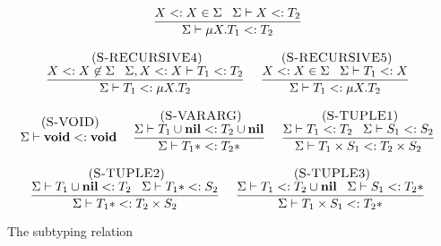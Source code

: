 \begin{figure}[!ht]
\begin{footnotesize}
$$\begin{array}{c}
\begin{array}{c}
\dfrac{X <: X \in \Sigma \;\;\;
       \Sigma \vdash X <: T_{2}}
      {\Sigma \vdash \mu X.T_{1} <: T_{2}}
\end{array}
\\ \\
\begin{array}{c}
\; (\textsc{S-RECURSIVE4})\\
\dfrac{X <: X \not\in \Sigma \;\;\;
       \Sigma, X <: X \vdash T_{1} <: T_{2}}
      {\Sigma \vdash T_{1} <: \mu X.T_{2}}
\end{array}
\;
\begin{array}{c}
\; (\textsc{S-RECURSIVE5})\\
\dfrac{X <: X \in \Sigma \;\;\;
       \Sigma \vdash T_{1} <: X}
      {\Sigma \vdash T_{1} <: \mu X.T_{2}}
\end{array}
\\ \\
\begin{array}{c}
\; (\textsc{S-VOID})\\
\Sigma \vdash \mathbf{void} <: \mathbf{void}
\end{array}
\;
\begin{array}{c}
\; (\textsc{S-VARARG})\\
\dfrac{\Sigma \vdash T_{1} \cup \mathbf{nil} <: T_{2} \cup \mathbf{nil}}
      {\Sigma \vdash T_{1}* <: T_{2}*}
\end{array}
\;
\begin{array}{c}
\; (\textsc{S-TUPLE1})\\
\dfrac{\Sigma \vdash T_{1} <: T_{2} \;\;\;
       \Sigma \vdash S_{1} <: S_{2}}
      {\Sigma \vdash T_{1} \times S_{1} <: T_{2} \times S_{2}}
\end{array}
\\ \\
\begin{array}{c}
\; (\textsc{S-TUPLE2})\\
\dfrac{\Sigma \vdash T_{1} \cup \mathbf{nil} <: T_{2} \;\;\;
       \Sigma \vdash T_{1}* <: S_{2}}
      {\Sigma \vdash T_{1}* <: T_{2} \times S_{2}}
\end{array}
\;
\begin{array}{c}
\; (\textsc{S-TUPLE3})\\
\dfrac{\Sigma \vdash T_{1} <: T_{2} \cup \mathbf{nil} \;\;\;
       \Sigma \vdash S_{1} <: T_{2}*}
      {\Sigma \vdash T_{1} \times S_{1} <: T_{2}*}
\end{array}
\end{array}
$$
\end{footnotesize}
\dend
\caption{The subtyping relation}
\label{fig:subtyping}
\end{figure}

